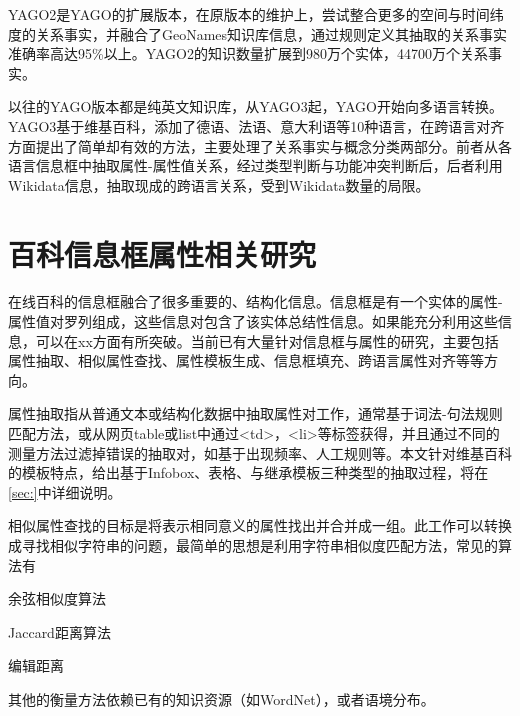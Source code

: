 {\henti YAGO2}是YAGO的扩展版本，在原版本的维护上，尝试整合更多的空间与时间纬度的关系事实，并融合了GeoNames知识库信息，通过规则定义\？其抽取的关系事实准确率高达95\%以上。YAGO2的知识数量扩展到980万个实体，44700万个关系事实。

以往的YAGO版本都是纯英文知识库，从YAGO3起，YAGO开始向多语言转换。YAGO3基于维基百科，添加了德语、法语、意大利语等10种语言，在跨语言对齐方面提出了简单却有效的方法，主要处理了关系事实与概念分类两部分。前者从各语言信息框中抽取属性-属性值关系，经过类型判断与功能冲突判断后，后者利用Wikidata信息，抽取现成的跨语言关系，受到Wikidata数量的局限。




\section{百科信息框属性相关研究}
\label{sec:property-research}
在线百科的信息框融合了很多重要的、结构化信息。信息框是有一个实体的属性-属性值对罗列组成，这些信息对包含了该实体总结性信息。如果能充分利用这些信息，可以在xx方面有所突破。当前已有大量针对信息框与属性的研究，主要包括属性抽取\cite{}、相似属性查找、属性模板生成、信息框填充、跨语言属性对齐等等方向。

{\heiti 属性抽取}指从普通文本或结构化数据中抽取属性对工作，通常基于词法-句法规则匹配方法\cite{pacsca2007role,lee2013attribute}，或从网页table或list中通过<td>，<li>等标签获得\cite{crestan2010web}，并且通过不同的测量方法过滤掉错误的抽取对，如基于出现频率\cite{pacsca2007role}、人工规则\cite{lee2013attribute}等。本文针对维基百科的模板特点，给出基于Infobox、表格、与继承模板三种类型的抽取过程，将在\ref{sec:}中详细说明。

{\heiti 相似属性查找}的目标是将表示相同意义的属性找出并合并成一组。此工作可以转换成寻找相似字符串的问题，最简单的思想是利用字符串相似度匹配方法，常见的算法有

余弦相似度算法

Jaccard距离算法

编辑距离

其他的衡量方法依赖已有的知识资源（如WordNet）\cite{yang2005measuring}，或者语境分布\cite{pantel2009web}。

